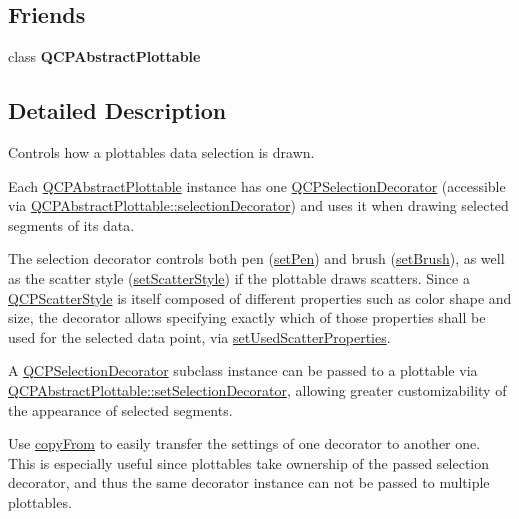 \subsection*{Friends}
\begin{DoxyCompactItemize}
\item 
\mbox{\label{classQCPSelectionDecorator_a53cf0e76aca814550c796fed79e345d6}} 
class {\bfseries Q\+C\+P\+Abstract\+Plottable}
\end{DoxyCompactItemize}


\subsection{Detailed Description}
Controls how a plottable\textquotesingle{}s data selection is drawn. 

Each \hyperlink{classQCPAbstractPlottable}{Q\+C\+P\+Abstract\+Plottable} instance has one \hyperlink{classQCPSelectionDecorator}{Q\+C\+P\+Selection\+Decorator} (accessible via \hyperlink{classQCPAbstractPlottable_a7861518e47ca0c6a0c386032c2db075e}{Q\+C\+P\+Abstract\+Plottable\+::selection\+Decorator}) and uses it when drawing selected segments of its data.

The selection decorator controls both pen (\hyperlink{classQCPSelectionDecorator_ac2c8192e1e294aa3a4a7f32a859e3d76}{set\+Pen}) and brush (\hyperlink{classQCPSelectionDecorator_aa74b626be518ea17055f918d423c8c2d}{set\+Brush}), as well as the scatter style (\hyperlink{classQCPSelectionDecorator_ab403a613289714ff4fd4a0c0371ab116}{set\+Scatter\+Style}) if the plottable draws scatters. Since a \hyperlink{classQCPScatterStyle}{Q\+C\+P\+Scatter\+Style} is itself composed of different properties such as color shape and size, the decorator allows specifying exactly which of those properties shall be used for the selected data point, via \hyperlink{classQCPSelectionDecorator_a808c1607cd4e83869c04986e332455c0}{set\+Used\+Scatter\+Properties}.

A \hyperlink{classQCPSelectionDecorator}{Q\+C\+P\+Selection\+Decorator} subclass instance can be passed to a plottable via \hyperlink{classQCPAbstractPlottable_a20e266ad646f8c4a7e4631040510e5d9}{Q\+C\+P\+Abstract\+Plottable\+::set\+Selection\+Decorator}, allowing greater customizability of the appearance of selected segments.

Use \hyperlink{classQCPSelectionDecorator_a467a8d5cfcab27e862a17c797ac27b8a}{copy\+From} to easily transfer the settings of one decorator to another one. This is especially useful since plottables take ownership of the passed selection decorator, and thus the same decorator instance can not be passed to multiple plottables.

